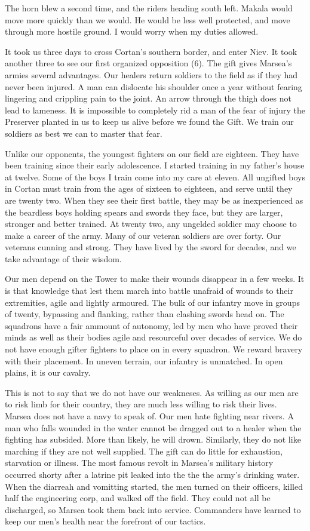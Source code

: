 \documentclass{article}
\begin{document}
The horn blew a second time, and the riders heading south left. Makala would move more quickly than we would. He would be less well protected, and move through more hostile ground. I would worry when my duties allowed.

It took us three days to cross Cortan's southern border, and enter Niev. It took another three to see our first organized opposition (6). The gift gives Marsea's armies several advantages. Our healers return soldiers to the field as if they had never been injured. A man can dislocate his shoulder once a year without fearing lingering and crippling pain to the joint. An arrow through the thigh does not lead to lameness. It is impossible to completely rid a man of the fear of injury the Preserver planted in us to keep us alive before we found the Gift. We train our soldiers as best we can to master that fear. 

Unlike our opponents, the youngest fighters on our field are eighteen. They have been training since their early adolescence. I started training in my father's house at twelve. Some of the boys I train come into my care at eleven. All ungifted boys in Cortan must train from the ages of sixteen to eighteen, and serve until they are twenty two. When they see their first battle, they may be as inexperienced as the beardless boys holding spears and swords they face, but they are larger, stronger and better trained. At twenty two, any ungelded soldier may choose to make a career of the army. Many of our veteran soldiers are over forty. Our veterans cunning and strong. They have lived by the sword for decades, and we take advantage of their wisdom.

Our men depend on the Tower to make their wounds disappear in a few weeks. It is that knowledge that lest them march into battle unafraid of wounds to their extremities, agile and lightly armoured. The bulk of our infantry move in groups of twenty, bypassing and flanking, rather than clashing swords head on. The squadrons have a fair ammount of autonomy, led by men who have proved their minds as well as their bodies agile and resourceful over decades of service. We do not have enough gifter fighters to place on in every squadron. We reward bravery with their placement. In uneven terrain, our infantry is unmatched. In open plains, it is our cavalry. 

This is not to say that we do not have our weakneses. As willing as our men are to risk limb for their country, they are much less willing to risk their lives. Marsea does not have a navy to speak of. Our men hate fighting near rivers. A man who falls wounded in the water cannot be dragged out to a healer when the fighting has subsided. More than likely, he will drown. Similarly, they do not like marching if they are not well supplied. The gift can do little for exhaustion,  starvation or illness. The most famous revolt in Marsea's military history occurred shorty after a latrine pit leaked into the the the army's drinking water. When the diarreah and vomitting started, the men turned on their officers, killed half the engineering corp, and walked off the field. They could not all be discharged, so Marsea took them back into service. Commanders have learned to keep our men's health near the forefront of our tactics.
\end{document}

